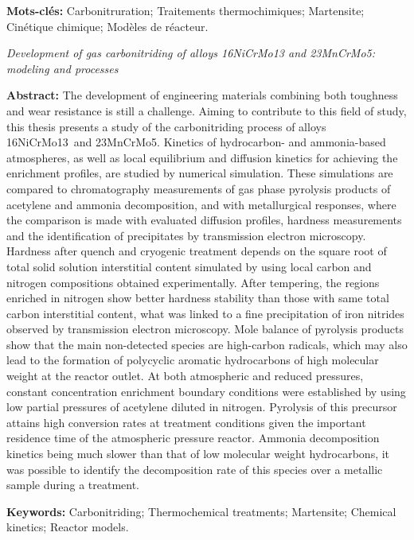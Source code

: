 {\par\vskip0.3cm\noindent\textbf{Mots-clés:} Carbonitruration; Traitements
thermochimiques; Martensite; Cinétique chimique; Modèles de réacteur.

\par\vskip0.3cm\noindent\emph{Development of gas carbonitriding of alloys
16NiCrMo13 and 23MnCrMo5: modeling and processes}\par\vskip0.4cm

\noindent\textbf{Abstract:} The development of engineering materials combining
both toughness and wear resistance is still a challenge. Aiming to contribute to
this field of study, this thesis presents a study of the carbonitriding process
of alloys 16NiCrMo13~and 23MnCrMo5. Kinetics of hydrocarbon- and ammonia-based
atmospheres, as well as local equilibrium and diffusion kinetics for achieving
the enrichment profiles, are studied by numerical simulation. These simulations
are compared to chromatography measurements of gas phase pyrolysis products of
acetylene and ammonia decomposition, and with metallurgical responses, where the
comparison is made with evaluated diffusion profiles, hardness measurements and
the identification of precipitates by transmission electron microscopy. Hardness
after quench and cryogenic treatment depends on the square root of total solid
solution interstitial content simulated by using local carbon and nitrogen
compositions obtained experimentally. After tempering, the regions enriched in
nitrogen show better hardness stability than those with same total carbon
interstitial content, what was linked to a fine precipitation of iron nitrides
observed by transmission electron microscopy. Mole balance of pyrolysis products
show that the main non-detected species are high-carbon radicals, which may also
lead to the formation of polycyclic aromatic hydrocarbons of high molecular
weight at the reactor outlet. At both atmospheric and reduced pressures,
constant concentration enrichment boundary conditions were established by using
low partial pressures of acetylene diluted in nitrogen. Pyrolysis of this
precursor attains high conversion rates at treatment conditions given the
important residence time of the atmospheric pressure reactor. Ammonia
decomposition kinetics being much slower than that of low molecular weight
hydrocarbons, it was possible to identify the decomposition rate of this species
over a metallic sample during  a treatment. 

\par\vskip0.3cm\noindent\textbf{Keywords:} Carbonitriding; Thermochemical
treatments; Martensite; Chemical kinetics; Reactor models.}
\endinput